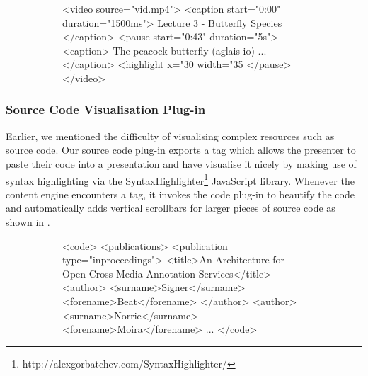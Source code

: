      \begin{figure}[h!]
      \begin{subfigure}{0.53\textwidth}
       \vspace{-1em}
       \begin{lstxml*}
<video source="vid.mp4">
 <caption start="0:00" duration="1500ms">
  Lecture 3 - Butterfly Species
 </caption>
 <pause start="0:43" duration="5s">
  <caption>
   The peacock butterfly (aglais io) ...
  </caption>
  <highlight x="30%
             width="35%
 </pause>
</video>
       \end{lstxml*}
      \end{subfigure}
      \hfill
      \begin{subfigure}{0.43\textwidth}
      \end{subfigure}
      \renewcommand{\figurename}{Listing}
      \renewcommand{\figureshortname}{Lst.}
     \end{figure}

 \newpage

    \subsubsection{Source Code Visualisation Plug-in}

     Earlier, we mentioned the difficulty of visualising complex resources such
     as source code. Our \mxp source code plug-in exports a  tag
     which allows the presenter to paste their code into a presentation and
     have \mxp visualise it nicely by making use of syntax highlighting via the
     SyntaxHighlighter\footnote{http://alexgorbatchev.com/SyntaxHighlighter/}
     JavaScript library. Whenever the content engine encounters a 
     tag, it invokes the code plug-in to beautify the code and automatically
     adds vertical scrollbars for larger pieces of source code as shown in
     .

     \begin{figure}[h!]
      \begin{subfigure}{0.53\textwidth}
       \vspace{-1em}
       \begin{lstxml*}
<code>
 <publications>
  <publication type="inproceedings">
   <title>An Architecture for Open Cross-Media
          Annotation Services</title>
   <author>
     <surname>Signer</surname>
     <forename>Beat</forename>
   </author>
   <author>
     <surname>Norrie</surname>
     <forename>Moira</forename>
   ...
</code>
       \end{lstxml*}
      \end{subfigure}
      \hfill
      \begin{subfigure}{0.43\textwidth}
      \end{subfigure}
      \renewcommand{\figurename}{Listing}
      \renewcommand{\figureshortname}{Lst.}
     \end{figure}

